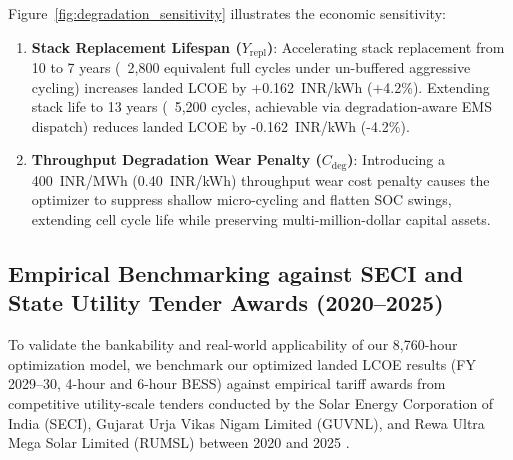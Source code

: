 \documentclass[11pt,a4paper]{article}
\begin{document}
Figure~\ref{fig:degradation_sensitivity} illustrates the economic sensitivity:
\begin{enumerate}
    \item \textbf{Stack Replacement Lifespan ($Y_{\text{repl}}$)}: Accelerating stack replacement from 10 to 7 years (~2,800 equivalent full cycles under un-buffered aggressive cycling) increases landed LCOE by +0.162~INR/kWh (+4.2\%). Extending stack life to 13 years (~5,200 cycles, achievable via degradation-aware EMS dispatch) reduces landed LCOE by -0.162~INR/kWh (-4.2\%).
    \item \textbf{Throughput Degradation Wear Penalty ($C_{\text{deg}}$)}: Introducing a 400~INR/MWh (0.40~INR/kWh) throughput wear cost penalty causes the optimizer to suppress shallow micro-cycling and flatten SOC swings, extending cell cycle life while preserving multi-million-dollar capital assets.
\end{enumerate}

\subsection{Empirical Benchmarking against SECI and State Utility Tender Awards (2020--2025)}
\label{sec:empirical_benchmarking}

To validate the bankability and real-world applicability of our 8,760-hour optimization model, we benchmark our optimized landed LCOE results (FY 2029--30, 4-hour and 6-hour BESS) against empirical tariff awards from competitive utility-scale tenders conducted by the Solar Energy Corporation of India (SECI), Gujarat Urja Vikas Nigam Limited (GUVNL), and Rewa Ultra Mega Solar Limited (RUMSL) between 2020 and 2025 \cite{Gulia2021, IEEFA2021, Gupta2024}.
\end{document}
